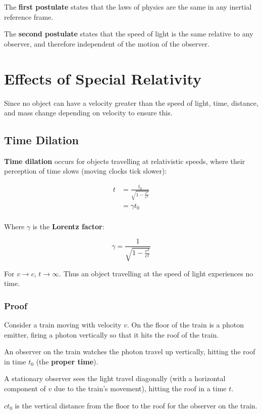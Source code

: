 \documentclass[a4paper,11pt]{report}
\begin{document}
The \textbf{first postulate} states that the laws of physics are the same in
any inertial reference frame.

The \textbf{second postulate} states that the speed of light is the same
relative to any observer, and therefore independent of the motion of the
observer.


\section{Effects of Special Relativity}

Since no object can have a velocity greater than the speed of light, time,
distance, and mass change depending on velocity to ensure this.

\subsection{Time Dilation}

\textbf{Time dilation} occurs for objects travelling at relativistic speeds,
where their perception of time slows (moving clocks tick slower):

$$
\begin{aligned}
t & = \frac{t_0}{\sqrt{1 - \frac{v^2}{c^2}}} \\
& = \gamma t_0 \\
\end{aligned}
$$

Where $\gamma$ is the \textbf{Lorentz factor}:

$$
\gamma = \frac{1}{\sqrt{1 - \frac{v^2}{c^2}}}
$$

For $v \to c$, $t \to \infty$. Thus an object travelling at the speed of light
experiences no time.

\subsubsection{Proof}

Consider a train moving with velocity $v$. On the floor of the train is a
photon emitter, firing a photon vertically so that it hits the roof of the
train.

An observer on the train watches the photon travel up vertically, hitting the
roof in time $t_0$ (the \textbf{proper time}).

A stationary observer sees the light travel diagonally (with a horizontal
component of $v$ due to the train's movement), hitting the roof in a time $t$.

$ct_0$ is the vertical distance from the floor to the roof for the observer on
the train.
\end{document}

